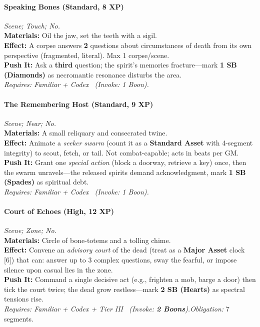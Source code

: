 \paragraph{Speaking Bones (Standard, 8 XP)} \emph{Scene; Touch; No.}\\
\textbf{Materials:} Oil the jaw, set the teeth with a sigil.\\
\textbf{Effect:} A corpse answers \textbf{2} questions about circumstances of death from its own perspective (fragmented, literal). Max 1 corpse/scene.\\
\textbf{Push It:} Ask a \textbf{third} question; the spirit's memories fracture—mark \textbf{1 SB (Diamonds)} as necromantic resonance disturbs the area.\\
\emph{Requires: Familiar + Codex \ (\textit{Invoke:} 1 Boon).}

\paragraph{The Remembering Host (Standard, 9 XP)} \emph{Scene; Near; No.}\\
\textbf{Materials:} A small reliquary and consecrated twine.\\
\textbf{Effect:} Animate a \emph{seeker swarm} (count it as a \textbf{Standard Asset} with 4-segment integrity) to scout, fetch, or tail. Not combat-capable; acts in beats per GM.\\
\textbf{Push It:} Grant one \emph{special action} (block a doorway, retrieve a key) once, then the swarm unravels—the released spirits demand acknowledgment, mark \textbf{1 SB (Spades)} as spiritual debt.\\
\emph{Requires: Familiar + Codex \ (\textit{Invoke:} 1 Boon).}

\paragraph{Court of Echoes (High, 12 XP)} \emph{Scene; Zone; No.}\\
\textbf{Materials:} Circle of bone-totems and a tolling chime.\\
\textbf{Effect:} Convene an \emph{advisory court} of the dead (treat as a \textbf{Major Asset} clock [6]) that can: answer up to 3 complex questions, sway the fearful, or impose silence upon casual lies in the zone.\\
\textbf{Push It:} Command a single decisive act (e.g., frighten a mob, barge a door) then tick the court twice; the dead grow restless—mark \textbf{2 SB (Hearts)} as spectral tensions rise.\\
\emph{Requires: Familiar + Codex + Tier III \ (\textit{Invoke:} \textbf{2 Boons}).}\quad \emph{Obligation:} 7 segments.